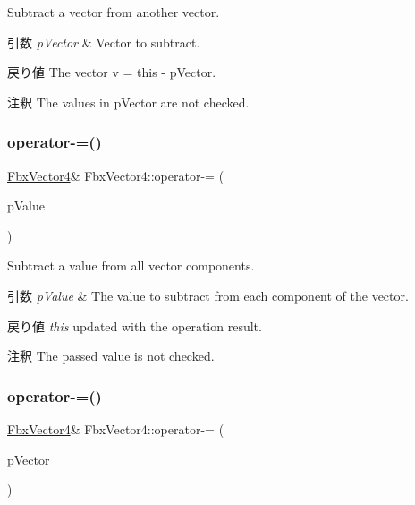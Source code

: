 Subtract a vector from another vector. 
\begin{DoxyParams}{引数}
{\em p\+Vector} & Vector to subtract. \\
\hline
\end{DoxyParams}
\begin{DoxyReturn}{戻り値}
The vector v\textquotesingle{} = this -\/ p\+Vector. 
\end{DoxyReturn}
\begin{DoxyRemark}{注釈}
The values in p\+Vector are not checked. 
\end{DoxyRemark}
\mbox{\label{class_fbx_vector4_a536bc542d0cb4cf6d4c86b1cf34d62a5}} 
\subsubsection{\texorpdfstring{operator-\/=()}{operator-=()}\hspace{0.1cm}{\footnotesize\ttfamily [1/2]}}
{\footnotesize\ttfamily \hyperlink{class_fbx_vector4}{Fbx\+Vector4}\& Fbx\+Vector4\+::operator-\/= (\begin{DoxyParamCaption}\item[{double}]{p\+Value }\end{DoxyParamCaption})}

Subtract a value from all vector components. 
\begin{DoxyParams}{引数}
{\em p\+Value} & The value to subtract from each component of the vector. \\
\hline
\end{DoxyParams}
\begin{DoxyReturn}{戻り値}
{\itshape this} updated with the operation result. 
\end{DoxyReturn}
\begin{DoxyRemark}{注釈}
The passed value is not checked. 
\end{DoxyRemark}
\mbox{\label{class_fbx_vector4_adbfdb7ee65fb83a6a489200e2a45f613}} 
\subsubsection{\texorpdfstring{operator-\/=()}{operator-=()}\hspace{0.1cm}{\footnotesize\ttfamily [2/2]}}
{\footnotesize\ttfamily \hyperlink{class_fbx_vector4}{Fbx\+Vector4}\& Fbx\+Vector4\+::operator-\/= (\begin{DoxyParamCaption}\item[{const \hyperlink{class_fbx_vector4}{Fbx\+Vector4} \&}]{p\+Vector }\end{DoxyParamCaption})}

